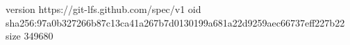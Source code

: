 version https://git-lfs.github.com/spec/v1
oid sha256:97a0b327266b87c13ca41a267b7d0130199a681a22d9259aec66737eff227b22
size 349680
